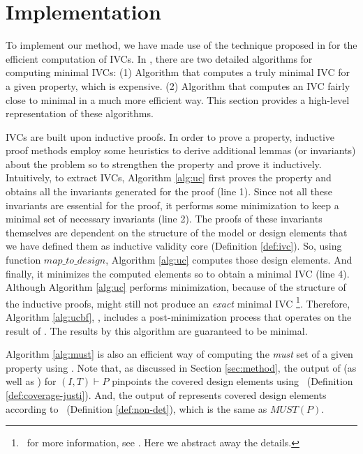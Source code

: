 \section{Implementation}
\label{sec:impl}

To implement our method, we have made use of the technique proposed in \cite{Ghass16} for the efficient computation of IVCs.
In \cite{Ghass16}, there are two detailed algorithms for computing minimal IVCs: (1) Algorithm \ucbfalg that computes a truly minimal IVC for a given property, which is expensive. (2) Algorithm \ucalg that computes an IVC fairly close to minimal in a much more efficient way. This section provides a high-level representation of these algorithms.

IVCs are built upon inductive proofs. In order to prove a property, inductive proof methods employ some heuristics to derive additional lemmas (or invariants) about the problem so to strengthen the property and prove it inductively. Intuitively, to extract IVCs, Algorithm \ref{alg:uc}
first proves the property and obtains all the invariants generated for the proof (line 1). Since not all these invariants are essential for the proof, it performs some minimization to keep a minimal set of necessary invariants (line 2). The proofs of these invariants themselves are dependent on the structure of the model or design elements that we have defined them as inductive validity core (Definition \ref{def:ivc}).
So, using function $map\_to\_design$, Algorithm \ref{alg:uc}
computes those design elements. And finally, it minimizes the computed elements so to obtain a minimal IVC (line 4). Although Algorithm \ref{alg:uc} performs minimization, because of the structure of the inductive proofs, \ucalg might still not produce an \emph{exact} minimal IVC \footnote{\noindent ~for more information, see \cite{Ghass16}. Here we abstract away the details.}.
Therefore, Algorithm \ref{alg:ucbf}, \ucbfalg, includes a post-minimization process that
operates on the result of \ucalg. The results by this algorithm are guaranteed to be minimal.

Algorithm \ref{alg:must} is also an efficient way of computing the \emph{must} set of a given property using \ucalg. Note that, as discussed in Section \ref{sec:method}, the
output of \ucalg (as well as \ucbfalg) for $(I, T) \vdash P$ pinpoints the covered design elements
using \ivccov\ (Definition \ref{def:coverage-justi}).
And, the output of \mustalg represents covered design elements according to \nondetcov\ (Definition \ref{def:non-det}), which is the same as $MUST(P)$.

